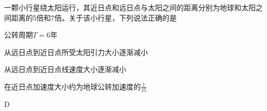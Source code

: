 一颗小行星绕太阳运行，其近日点和远日点与太阳之间的距离分别为地球和太阳之间距离的5倍和7倍。关于该小行星，下列说法正确的是\paren[]
\begin{choices}
	\item 公转周期\(T = 6\)年
	\item 从远日点到近日点所受太阳引力大小逐渐减小
	\item 从远日点到近日点线速度大小逐渐减小
	\item 在近日点加速度大小约为地球公转加速度的\(\frac{1}{25}\)
\end{choices}
\begin{answer}
	D
\end{answer}